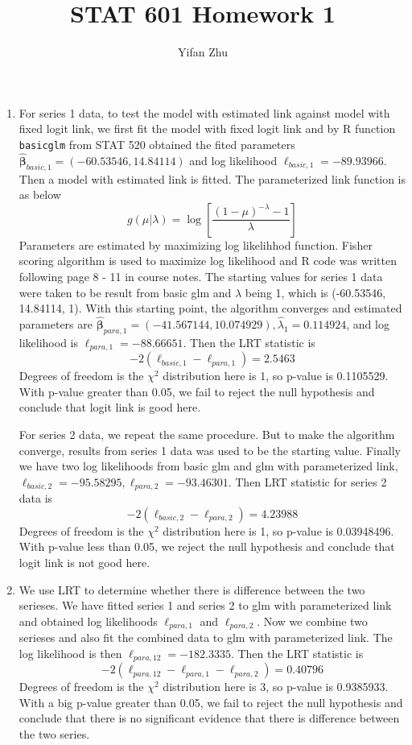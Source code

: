 \documentclass{article}
\begin{document}
	

	
	\title{STAT 601 Homework 1}
	\author{Yifan Zhu}
	\maketitle
	
	\begin{enumerate}[leftmargin = 0 em, label = \arabic*., font = \bfseries]
	\item 
	For series 1 data, to test the model with estimated link against model with fixed logit link, we first fit the model with fixed logit link and by R function \verb|basicglm| from STAT 520 obtained the fited parameters $\hat{\bm \beta}_{basic, 1} = (-60.53546, 14.84114)$ and log likelihood $\ell_{basic, 1} = -89.93966$. Then a model with estimated link is fitted. The parameterized link function is as below
	\[g(\mu | \lambda) = \log\left[\frac{(1 - \mu)^{- \lambda} - 1}{\lambda}\right]\]
	Parameters are estimated by maximizing log likelihhod function. Fisher scoring algorithm is used to maximize log likelihood and R code was written following page 8 - 11 in course notes. The starting values for series 1 data were taken to be result from basic glm and $\lambda$ being 1, which is (-60.53546, 14.84114, 1). With this starting point, the algorithm converges and estimated parameters are $\hat{\bm \beta}_{para, 1} = (-41.567144, 10.074929), \hat{\lambda}_1 = 0.114924$, and log likelihood is $\ell_{para, 1} = -88.66651$. Then the LRT statistic is
	\[-2 (\ell_{basic, 1} - \ell_{para,1}) = 2.5463\]
    Degrees of freedom is the $\chi^2$ distribution here is 1, so p-value is 0.1105529. With p-value greater than 0.05, we fail to reject the null hypothesis and conclude that logit link is good here.

    For series 2 data, we repeat the same procedure. But to make the algorithm converge, results from series 1 data was used to be the starting value. Finally we have two log likelihoods from basic glm and glm with parameterized link, $\ell_{basic, 2} = -95.58295, \ell_{para, 2} = -93.46301$. Then LRT statistic for series 2 data is
    \[-2 (\ell_{basic, 2} - \ell_{para,2}) = 4.23988\]
    Degrees of freedom is the $\chi^2$ distribution here is 1, so p-value is 0.03948496. With p-value less than 0.05, we reject the null hypothesis and conclude that logit link is not good here.


    \item 
    We use LRT to determine whether there is difference between the two serieses. We have fitted series 1 and series 2 to glm with parameterized link and obtained log likelihoods $\ell_{para, 1}$ and $\ell_{para, 2}$. Now we combine two serieses and also fit the combined data to glm with parameterized link. The log likelihood is then $\ell_{para, 12} = -182.3335$. Then the LRT statistic is
    \[-2 (\ell_{para, 12} - \ell_{para, 1} - \ell_{para, 2}) = 0.40796\]
      Degrees of freedom is the $\chi^2$ distribution here is 3, so p-value is 0.9385933. With a big p-value greater than 0.05, we fail to reject the null hypothesis and conclude that there is no significant evidence that there is difference between the two series.



\end{enumerate}
\end{document}
